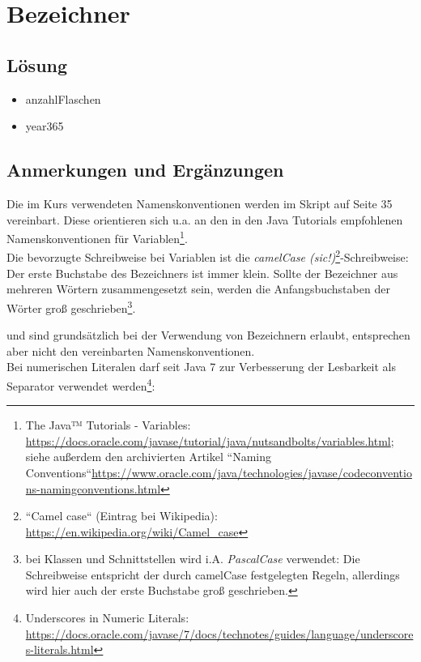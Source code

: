 \chapter{Bezeichner}

\section*{Lösung}

\begin{itemize}
    \item anzahlFlaschen
    \item year365
\end{itemize}


\section*{Anmerkungen und Ergänzungen}


Die im Kurs verwendeten Namenskonventionen werden im Skript auf Seite 35 vereinbart.
Diese orientieren sich u.a. an den in den Java Tutorials empfohlenen Namenskonventionen für Variablen\footnote{The Java™ Tutorials - Variables:
    \url{https://docs.oracle.com/javase/tutorial/java/nutsandbolts/variables.html};
    siehe außerdem den archivierten Artikel ``Naming Conventions``\url{https://www.oracle.com/java/technologies/javase/codeconventions-namingconventions.html}
}.\\

Die bevorzugte Schreibweise bei Variablen ist die \textit{camelCase (sic!)}\footnote{``Camel case`` (Eintrag bei Wikipedia): \url{https://en.wikipedia.org/wiki/Camel_case}}-Schreibweise: Der erste
Buchstabe des Bezeichners ist immer klein.
Sollte der Bezeichner aus mehreren Wörtern zusammengesetzt sein, werden die Anfangsbuchstaben der Wörter groß
geschrieben\footnote{
    bei Klassen und Schnittstellen wird i.A. \textit{PascalCase} verwendet: Die Schreibweise entspricht der durch camelCase festgelegten Regeln, allerdings wird hier auch der erste Buchstabe groß geschrieben.
}.

\code{_} und \code{$} sind grundsätzlich bei der Verwendung von Bezeichnern erlaubt, entsprechen aber nicht
den vereinbarten Namenskonventionen.\\

Bei numerischen Literalen darf \code{_} seit Java 7 zur Verbesserung der Lesbarkeit als Separator verwendet werden\footnote{
    Underscores in Numeric Literals: \url{https://docs.oracle.com/javase/7/docs/technotes/guides/language/underscores-literals.html}
}:

